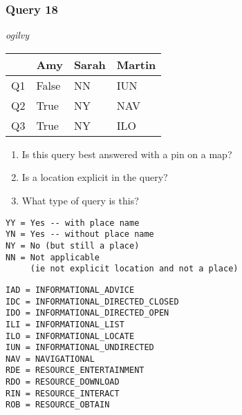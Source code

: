 \begin{frame}[fragile]
\frametitle{Query 18}
\vspace{1em}

\emph{ogilvy}

\vfill

\begin{table}
  \centering
  \begin{tabular}{ l l l l }
    & \textbf{Amy} & \textbf{Sarah} & \textbf{Martin}\\
    \toprule
    Q1 & False & NN & IUN\\
Q2 & True & NY & NAV\\
Q3 & True & NY & ILO\\
    \bottomrule
  \end{tabular}
\end{table}

\vfill

\tiny{

\begin{enumerate}
\item Is this query best answered with a pin on a map?
\item Is a location explicit in the query?
\item What type of query is this?
\end{enumerate}

\vfill

\begin{multicols}{2}
\begin{verbatim}
YY = Yes -- with place name
YN = Yes -- without place name
NY = No (but still a place)
NN = Not applicable 
     (ie not explicit location and not a place)
\end{verbatim}

\columnbreak
\begin{verbatim}
IAD = INFORMATIONAL_ADVICE
IDC = INFORMATIONAL_DIRECTED_CLOSED
IDO = INFORMATIONAL_DIRECTED_OPEN
ILI = INFORMATIONAL_LIST
ILO = INFORMATIONAL_LOCATE
IUN = INFORMATIONAL_UNDIRECTED
NAV = NAVIGATIONAL
RDE = RESOURCE_ENTERTAINMENT
RDO = RESOURCE_DOWNLOAD
RIN = RESOURCE_INTERACT
ROB = RESOURCE_OBTAIN
\end{verbatim}
\end{multicols}
}

\end{frame}


